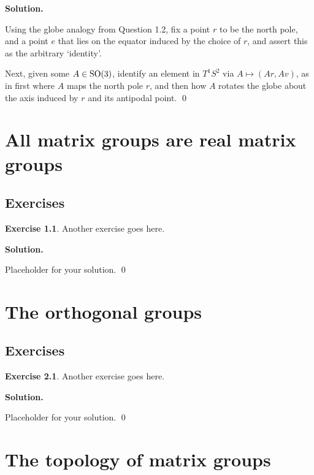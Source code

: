 \documentclass[12pt]{book}
\theoremstyle{definition}
\newtheorem{exercise}{Exercise}[chapter]
\newenvironment{solution}
{%
  \par\noindent\textbf{Solution.}\quad
}
{%
  \qed\par
}
\begin{document}
\begin{solution}
Using the globe analogy from Question 1.2, fix a point $r$ to be the north pole, 
and a point $e$ that lies on the equator induced by the choice of $r$, and assert this as the arbitrary `identity'.

Next, given some $A \in \mathrm{SO}(3)$, identify an element in $T^1S^2$ via $A \mapsto (Ar, Av)$, 
as in first where $A$ maps the north pole $r$, and then how $A$ rotates the globe about the axis induced by $r$ and its antipodal point.
\end{solution}

\chapter{All matrix groups are real matrix groups}
\section{Exercises}

\begin{exercise}
Another exercise goes here.
\end{exercise}

\begin{solution}
Placeholder for your solution.
\end{solution}

\chapter{The orthogonal groups}
\section{Exercises}

\begin{exercise}
Another exercise goes here.
\end{exercise}

\begin{solution}
Placeholder for your solution.
\end{solution}

\chapter{The topology of matrix groups}
\end{document}
